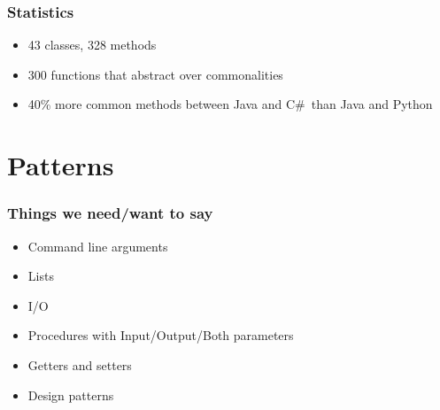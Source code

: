 \documentclass{beamer}
\newcommand{\Csharp}{C\#}
\begin{document}
\begin{frame}

\frametitle{Statistics}

\begin{itemize}
  \item 43 classes, 328 methods
  \item 300 functions that abstract over commonalities
  \item 40\% more common methods between Java and \Csharp~than Java and Python
\end{itemize}


\end{frame}


\section[Patterns]{Patterns}


\begin{frame}

\frametitle{Things we need/want to say}

\begin{itemize}
  \item Command line arguments
  \item Lists
  \item I/O
  \item Procedures with Input/Output/Both parameters
  \item Getters and setters
  \item Design patterns
\end{itemize}

\end{frame}

\end{document}
